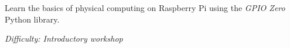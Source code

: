 %
%
%

\newif\ifprint
\printfalse



\newcommand{\workshopTitle}{Workshop 15: GPIO Zero}

\newcommand{\workshopAuthor}{Written by Jack Kelly}



	
	
	Learn the basics of physical computing on Raspberry Pi using the \textit{GPIO Zero} Python library.
	
	\textit{Difficulty: Introductory workshop}
	
	\ifprint
		\renewcommand{\baselinestretch}{0.75}\normalsize
		\tableofcontents
		\renewcommand{\baselinestretch}{1.0}\normalsize
	\else
		\tableofcontents
	\fi
	
	
	
	
	\clearpage
	
	
	\webclearpage
	
	
	

	
	
	\clearpage
	\begin{appendices}
		
		
		\webclearpage
		
	\end{appendices}

